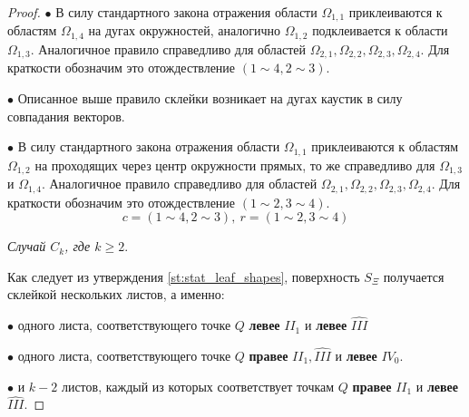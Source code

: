 \begin{proof}
$\bullet$ В силу стандартного закона отражения области $\Omega_{1, 1}$ приклеиваются к областям $\Omega_{1,4}$ на дугах окружностей, аналогично $\Omega_{1,2}$ подклеивается к области $\Omega_{1,3}$. Аналогичное правило справедливо для областей $\Omega_{2,1}, \Omega_{2,2}, \Omega_{2,3}, \Omega_{2,4}$. Для краткости обозначим это отождествление $(1 \sim 4, 2 \sim 3)$.

$\bullet$ Описанное выше правило склейки возникает на дугах каустик в силу совпадания векторов.

$\bullet$ В силу стандартного закона отражения области $\Omega_{1, 1}$ приклеиваются к областям $\Omega_{1,2}$ на проходящих через центр окружности прямых, то же справедливо для $\Omega_{1,3}$ и $\Omega_{1,4}$. Аналогичное правило справедливо для областей $\Omega_{2,1}, \Omega_{2,2}, \Omega_{2,3}, \Omega_{2,4}$. Для краткости обозначим это отождествление $(1 \sim 2, 3 \sim 4)$.
\begin{equation}
c = (1 \sim 4, 2 \sim 3), \ r = (1 \sim 2, 3 \sim 4)
\label{eq:RCrules_circle} 
\end{equation}


\textit{Случай $C_k$, где $k\geq2$}. 

Как следует из утверждения \ref{st:stat_leaf_shapes}, 
поверхность $S_\Xi$ получается склейкой нескольких листов, 
а именно:

$\bullet$ одного листа, соответствующего точке $Q$ \textbf{левее} $II_1$ и \textbf{левее} $\widehat{III}$

$\bullet$ одного листа, соответствующего точке $Q$ \textbf{правее} $II_1, \widehat{III}$ и \textbf{левее} $IV_0$.

$\bullet$ и $k-2$ листов, каждый из которых соответствует точкам $Q$ \textbf{правее} $II_1$ и \textbf{левее} $\widehat{III}$.


\end{proof}
